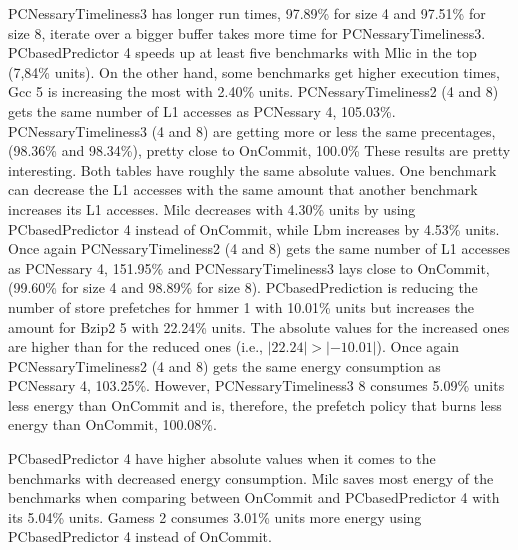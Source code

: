 PCNessaryTimeliness3 has longer run times, 97.89\% for size 4 and 97.51\% for size 8,
iterate over a bigger buffer takes more time for PCNessaryTimeliness3.
PCbasedPredictor 4 speeds up at least five benchmarks with Mlic in the top (7,84\%
units). On the other hand, some benchmarks get higher execution times, Gcc 5 is
increasing the most with 2.40\% units.
\resAcc
{}
PCNessaryTimeliness2 (4 and 8) gets the same number of L1 accesses as PCNessary 4, 105.03\%. PCNessaryTimeliness3 (4 and 8) are getting more or less the same precentages, (98.36\% and 98.34\%), pretty close to OnCommit, 100.0\%
 These results are pretty interesting. Both tables have roughly the same absolute
values. One benchmark can decrease the L1 accesses with the same amount that
another benchmark increases its L1 accesses. Milc decreases with 4.30\% units by
using PCbasedPredictor 4 instead of OnCommit, while Lbm increases by 4.53\% units.
\resSp
{}
Once again PCNessaryTimeliness2 (4 and 8) gets the same number of L1 accesses as PCNessary 4, 151.95\% and PCNessaryTimeliness3 lays close to OnCommit, (99.60\% for size 4 and 98.89\% for size 8).
PCbasedPrediction is reducing the number of store prefetches for hmmer 1 with
10.01\% units but increases the amount for Bzip2 5 with 22.24\% units. The absolute values for the increased ones are higher than for the reduced ones (i.e., $|22.24| > | − 10.01|$).
\resEnergy
{}
Once again PCNessaryTimeliness2 (4 and 8) gets the same energy consumption as
PCNessary 4, 103.25\%. However, PCNessaryTimeliness3 8 consumes 5.09\% units less
energy than OnCommit and is, therefore, the prefetch policy that burns less energy than OnCommit,  100.08\%.
  
PCbasedPredictor 4 have higher absolute values when it comes to the benchmarks with decreased energy consumption. Milc saves most energy of the benchmarks when comparing between OnCommit and PCbasedPredictor 4 with its 5.04\% units.
Gamess 2 consumes 3.01\% units more energy using PCbasedPredictor 4 instead of
OnCommit.

